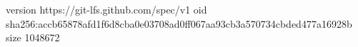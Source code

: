 version https://git-lfs.github.com/spec/v1
oid sha256:accb65878afd1f6d8cba0e03708ad0ff067aa93cb3a570734cbded477a16928b
size 1048672
